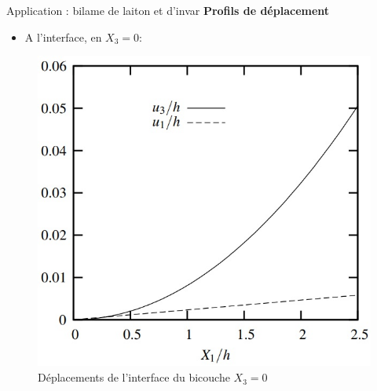 \begin{frame}{Application : bilame de laiton et d'invar}
    \textbf{\Large{Profils de déplacement}}
    
    \begin{itemize}
        \item A l'interface, en $X_3=0$:
    \end{itemize}
    \begin{figure}
        \centering
        \includegraphics[scale=0.5]{imgs/graph1.jpg}
        \caption{Déplacements de l'interface du bicouche $X_3=0$}
    \end{figure}
\end{frame}

